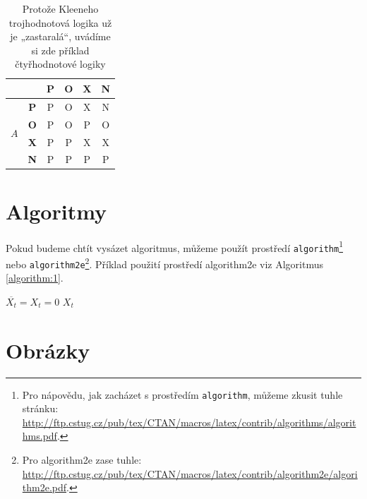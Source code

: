 \documentclass[11pt, ]{article}
\begin{document}
\begin{table}[h!]
\begin{tabular}{|c|c|c|c|c|c|}
        \multicolumn{2}{|c|}{}&\textbf{P}&\textbf{O}&\textbf{X}&\textbf{N}\\
        \hline
        \multirow{4}{*}{$$A$$}
        &\textbf{P}  &   P   &   O   &   X   &   N\\
        \cline{2-6}
        &\textbf{O}  &   P   &   O   &   P   &   O\\
        \cline{2-6}
        &\textbf{X}  &   P   &   P   &   X   &   X\\
        \cline{2-6}
        &\textbf{N}  &   P   &   P   &   P   &   P\\
        \hline
    \end{tabular}
    \caption{Protože Kleeneho trojhodnotová logika už je „zastaralá“, uvádíme si zde příklad čtyřhodnotové logiky}
    \label{tab:2}
\end{table} 



\section{Algoritmy}

Pokud budeme chtít vysázet algoritmus, můžeme použít prostředí \verb!algorithm!\footnote{Pro nápovědu, jak zacházet s prostředím \texttt{algorithm}, můžeme zkusit tuhle stránku:\newline
\url{http://ftp.cstug.cz/pub/tex/CTAN/macros/latex/contrib/algorithms/algorithms.pdf}.}
nebo \verb!algorithm2e!\footnote{Pro algorithm2e zase tuhle:
\url{http://ftp.cstug.cz/pub/tex/CTAN/macros/latex/contrib/algorithm2e/algorithm2e.pdf}.}.
Příklad použití prostředí algorithm2e viz Algoritmus \ref{algorithm:1}.

\begin{algorithm}[H] \label{algorithm:1}
\DontPrintSemicolon
\LinesNumbered
\SetNlSty{}{}{:}
$\overline{X_t} = X_t = 0$\;
\Return $X_t$
\caption{FAST\large SLAM}
\end{algorithm}

\section{Obrázky}
\end{document}
